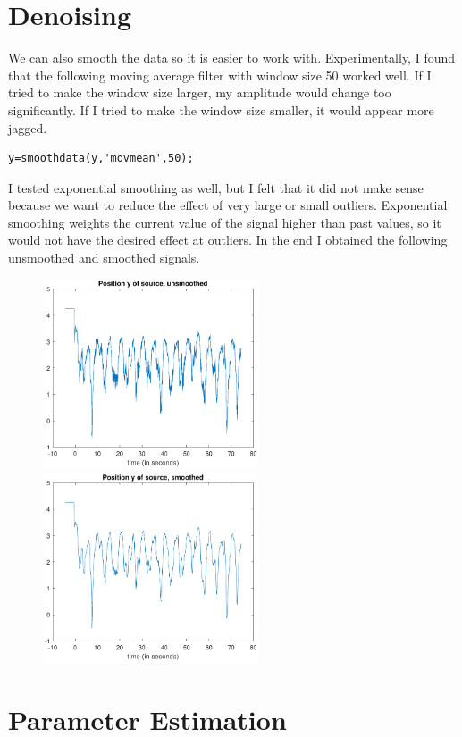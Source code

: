 \documentclass[12pt]{article}
\begin{document}
\section{Denoising}

We can also smooth the data so it is easier to work with. Experimentally, I found that the following
moving average filter with window size 50 worked well. If I tried to make the window
size larger, my amplitude would change too significantly. If I tried to make the window
size smaller, it would appear more jagged.
\begin{verbatim}
y=smoothdata(y,'movmean',50);
\end{verbatim}
I tested exponential smoothing as well, but I felt that it did not make sense because we want
to reduce the effect of very large or small outliers. Exponential smoothing weights the current
value of the signal higher than past values, so it would not have the desired effect at outliers.
In the end I obtained the following unsmoothed and smoothed signals.
\begin{figure}[H]
    \begin{center}
        \includegraphics[width=2.5in]{y-unsmoothed.pdf}
        \includegraphics[width=2.5in]{y-smoothed.pdf}
    \end{center}
\end{figure}

\section{Parameter Estimation}
\end{document}
